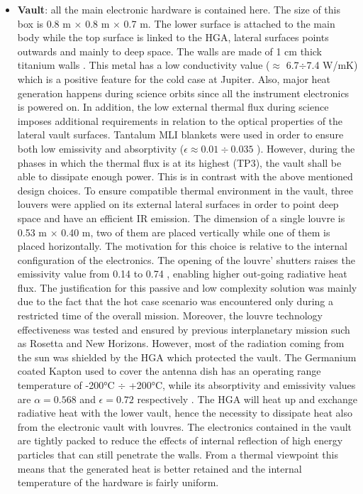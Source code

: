 \begin{itemize}
    \item \textbf{Vault}:  all the main electronic hardware is contained here. The size of this box is 0.8 m $\times$ 0.8 m $\times$ 0.7 m. The lower surface is attached to the main body while the top surface is linked to the HGA, lateral surfaces points outwards and mainly to deep space. The walls are made of 1 cm thick titanium walls \cite{Rad_vault}. This metal has a low conductivity value ($\approx$ 6.7$\div$7.4 W/mK) which is a positive feature for the cold case at Jupiter. Also, major heat generation happens during science orbits since all the instrument electronics is powered on. In addition, the low external thermal flux during science imposes additional requirements in relation to the optical properties of the lateral vault surfaces. 
    Tantalum MLI blankets were used in order to ensure both low emissivity and absorptivity ($\epsilon \approx 0.01 \div 0.035$ \cite{mli_blankets}). 
    However, during the phases in which the thermal flux is at its highest (TP3), the vault shall be able to dissipate enough power. This is in contrast with the above mentioned design choices. To ensure compatible thermal environment in the vault, three louvers were applied on its external lateral surfaces in order to point deep space and have an efficient IR emission. The dimension of a single louvre is 0.53 m $\times$ 0.40 m, two of them are placed vertically while one of them is placed horizontally. The motivation for this choice is relative to the internal configuration of the electronics. The opening of the louvre' shutters raises the emissivity value from 0.14 to 0.74 , enabling higher out-going radiative heat flux.\cite{louvers}
    The justification for this passive and low complexity solution  was mainly due to the fact that the hot case scenario was encountered only during a restricted time of the overall mission. Moreover, the louvre technology effectiveness was tested and ensured by previous interplanetary mission such as Rosetta and New Horizons. 
    However, most of the radiation coming from the sun was shielded by the HGA which protected the vault. 
    The Germanium coated Kapton used to cover the antenna dish has an operating range temperature of -200°C $\div$ +200°C, while its absorptivity and emissivity values are $\alpha = 0.568$ and  $\epsilon = 0.72$ respectively \cite{ge_kapton}.
    The HGA will heat up and exchange radiative heat with the lower vault, hence the necessity to dissipate heat also from the electronic vault with louvres.
    The electronics contained in the vault are tightly packed to reduce the effects of internal reflection of high energy particles that can still penetrate the walls. From a thermal viewpoint this means that the generated heat is better retained and the internal temperature of the hardware is fairly uniform.
    

\end{itemize}
